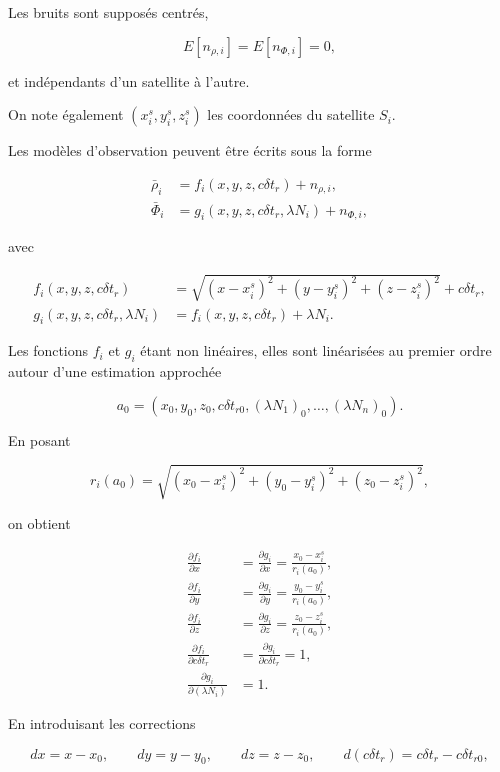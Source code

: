 Les bruits sont supposés centrés,

\[
E[n_{\rho,i}]
=
E[n_{\Phi,i}]
=
0,
\]

et indépendants d'un satellite à l'autre.

On note également $(x_i^s,y_i^s,z_i^s)$ les coordonnées du satellite $S_i$.

Les modèles d'observation peuvent être écrits sous la forme

\begin{align}
\bar{\rho}_i
&=
f_i(x,y,z,c\delta t_r)
+
n_{\rho,i},
\\
\bar{\Phi}_i
&=
g_i(x,y,z,c\delta t_r,\lambda N_i)
+
n_{\Phi,i},
\end{align}

avec

\begin{align}
f_i(x,y,z,c\delta t_r)
&=
\sqrt{(x-x_i^s)^2+(y-y_i^s)^2+(z-z_i^s)^2}
+
c\delta t_r,
\\
g_i(x,y,z,c\delta t_r,\lambda N_i)
&=
f_i(x,y,z,c\delta t_r)
+
\lambda N_i.
\end{align}

Les fonctions $f_i$ et $g_i$ étant non linéaires, elles sont linéarisées au premier ordre autour d'une estimation approchée

\[
a_0=
(x_0,y_0,z_0,c\delta t_{r0},
(\lambda N_1)_0,\ldots,(\lambda N_n)_0).
\]

En posant

\[
r_i(a_0)
=
\sqrt{(x_0-x_i^s)^2+(y_0-y_i^s)^2+(z_0-z_i^s)^2},
\]

on obtient

\begin{align}
\frac{\partial f_i}{\partial x}
&=
\frac{\partial g_i}{\partial x}
=
\frac{x_0-x_i^s}{r_i(a_0)},
\\
\frac{\partial f_i}{\partial y}
&=
\frac{\partial g_i}{\partial y}
=
\frac{y_0-y_i^s}{r_i(a_0)},
\\
\frac{\partial f_i}{\partial z}
&=
\frac{\partial g_i}{\partial z}
=
\frac{z_0-z_i^s}{r_i(a_0)},
\\
\frac{\partial f_i}{\partial c\delta t_r}
&=
\frac{\partial g_i}{\partial c\delta t_r}
=
1,
\\
\frac{\partial g_i}{\partial (\lambda N_i)}
&=
1.
\end{align}

En introduisant les corrections

\[
dx=x-x_0,\qquad
dy=y-y_0,\qquad
dz=z-z_0,\qquad
d(c\delta t_r)=c\delta t_r-c\delta t_{r0},
\]

